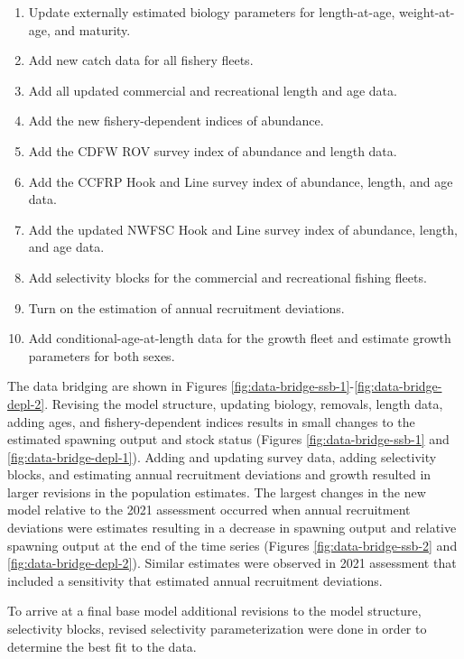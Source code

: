 \documentclass[11pt,
  english,
  letterpaper,
]{article}
\providecommand{\tightlist}{%
  \setlength{\itemsep}{0pt}\setlength{\parskip}{0pt}}
\providecommand{\tightlist}{%
  \setlength{\itemsep}{0pt}\setlength{\parskip}{0pt}}
\begin{document}
\begin{enumerate}
\def\labelenumi{\arabic{enumi}.}
\tightlist
\item
  Update externally estimated biology parameters for length-at-age, weight-at-age, and maturity.
\item
  Add new catch data for all fishery fleets.
\item
  Add all updated commercial and recreational length and age data.
\item
  Add the new fishery-dependent indices of abundance.
\item
  Add the CDFW ROV survey index of abundance and length data.
\item
  Add the CCFRP Hook and Line survey index of abundance, length, and age data.
\item
  Add the updated NWFSC Hook and Line survey index of abundance, length, and age data.
\item
  Add selectivity blocks for the commercial and recreational fishing fleets.
\item
  Turn on the estimation of annual recruitment deviations.
\item
  Add conditional-age-at-length data for the growth fleet and estimate growth parameters for both sexes.
\end{enumerate}

The data bridging are shown in Figures \ref{fig:data-bridge-ssb-1}-\ref{fig:data-bridge-depl-2}. Revising the model structure, updating biology, removals, length data, adding ages, and fishery-dependent indices results in small changes to the estimated spawning output and stock status (Figures \ref{fig:data-bridge-ssb-1} and \ref{fig:data-bridge-depl-1}). Adding and updating survey data, adding selectivity blocks, and estimating annual recruitment deviations and growth resulted in larger revisions in the population estimates. The largest changes in the new model relative to the 2021 assessment occurred when annual recruitment deviations were estimates resulting in a decrease in spawning output and relative spawning output at the end of the time series (Figures \ref{fig:data-bridge-ssb-2} and \ref{fig:data-bridge-depl-2}). Similar estimates were observed in 2021 assessment that included a sensitivity that estimated annual recruitment deviations.

To arrive at a final base model additional revisions to the model structure, selectivity blocks, revised selectivity parameterization were done in order to determine the best fit to the data.
\end{document}
